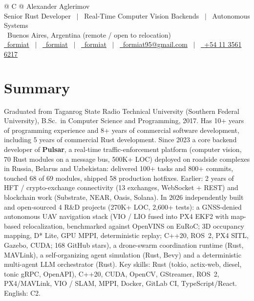 \documentclass[a4paper,11pt]{article}
\begin{document}
\pagestyle{empty} 


\begin{tabularx}{\linewidth}{@{} C @{}}
\Huge{Alexander Aglerimov} \\[4pt]
\large{Senior Rust Developer \ $|$ \ Real-Time Computer Vision Backends \ $|$ \ Autonomous Systems} \\[3pt]
\raisebox{-0.05\height}\faMapMarker \ Buenos Aires, Argentina (remote / open to relocation) \\[7.5pt]
\href{https://github.com/formiat}{\raisebox{-0.05\height}\faGithub\ formiat} \ $|$ \ 
\href{https://linkedin.com/in/formiat}{\raisebox{-0.05\height}\faLinkedin\ formiat} \ $|$ \ 
\href{https://t.me/formiat}{\raisebox{-0.05\height}\faTelegram\ formiat} \ $|$ \ 
\href{mailto:formiat95@gmail.com}{\raisebox{-0.05\height}\faEnvelope \ formiat95@gmail.com} \ $|$ \ 
\href{tel:+541135616217}{\raisebox{-0.05\height}\faMobile \ +54 11 3561 6217} \\
\end{tabularx}

\section{Summary}
Graduated from Taganrog State Radio Technical University (Southern Federal University), B.Sc.\ in Computer Science and Programming, 2017.
Has 10+ years of programming experience and 8+ years of commercial software development, including 5 years of commercial Rust development.
Since 2023 a core backend developer of \textbf{Pulsar}, a real-time traffic-enforcement platform (computer vision, 70 Rust modules on a message bus, 500K+ LOC) deployed on roadside complexes in Russia, Belarus and Uzbekistan: delivered 100+ tasks and 800+ commits, touched 68 of 69 modules, shipped 58 production hotfixes.
Earlier: 2 years of HFT / crypto-exchange connectivity (13 exchanges, WebSocket + REST) and blockchain work (Substrate, NEAR, Oasis, Solana).
In 2026 independently built and open-sourced 4 R\&D projects (270K+ LOC, 2,600+ tests): a GNSS-denied autonomous UAV navigation stack (VIO / LIO fused into PX4 EKF2 with map-based relocalization, benchmarked against OpenVINS on EuRoC; 3D occupancy mapping, D* Lite, GPU MPPI, deterministic replay; C++20, ROS~2, PX4 SITL, Gazebo, CUDA; 168 GitHub stars), a drone-swarm coordination runtime (Rust, MAVLink), a self-organizing agent simulation (Rust, Bevy) and a deterministic multi-agent LLM orchestrator (Rust).
Key skills: Rust (tokio, actix-web, diesel, tonic gRPC, OpenAPI), C++20, CUDA, OpenCV, GStreamer, ROS~2, PX4/MAVLink, VIO / SLAM, MPPI, Docker, GitLab CI, TypeScript/React. English: C2.
\end{document}
